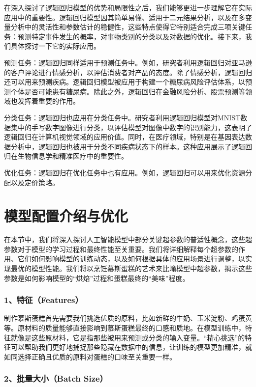 \begin{itemize}
在深入探讨了逻辑回归模型的优势和局限性之后，我们能够更进一步理解它在实际应用中的重要性。逻辑回归模型因其简单易懂、适用于二元结果分析，以及在多变量分析中的灵活性和参数估计的稳健性，这些特点使得它特别适合完成三项关键任务：预测特定事件发生的概率，对事物类别的分类以及对数据的优化。接下来，我们具体探讨一下它的实际应用。
            
预测任务：逻辑回归同样适用于预测任务中。例如，研究者利用逻辑回归对亚马逊的客户评论进行情感分析，以评估消费者对产品的态度。除了情感分析，逻辑回归还可以用来预测疾病。逻辑回归模型被应用于构建一个糖尿病风险评估体系，以预测个体是否可能患有糖尿病。除此之外，逻辑回归在金融风险分析、股票预测等领域也发挥着重要的作用。
            
分类任务：逻辑回归也应用在分类任务中。研究者利用逻辑回归模型对MNIST数据集中的手写数字图像进行分类，以评估模型对图像中数字的识别能力，这表明了逻辑回归在计算机视觉领域的应用价值。同时，在医疗领域，特别是在基因表达数据分析中，逻辑回归也被用于分类不同疾病状态下的样本。这种应用展示了逻辑回归在生物信息学和精准医疗中的重要性。
            
优化任务：逻辑回归在优化任务中也有应用。例如，逻辑回归可以用来优化资源分配以及定价策略。
\end{itemize}

\section{模型配置介绍与优化} 

在本节中，我们将深入探讨人工智能模型中部分关键超参数的普适性概念，这些超参数对于模型的学习过程和最终性能至关重要。我们将详细解释每个超参数的作用、它们如何影响模型的训练动态，以及如何根据具体的应用场景进行调整，以实现最优的模型性能。我们将以烹饪慕斯蛋糕的艺术来比喻模型中超参数，揭示这些参数是如何影响模型的“烘焙”过程和蛋糕最终的“美味”程度。

\subsubsection{1、特征（Features）}

制作慕斯蛋糕首先需要我们挑选优质的原料，比如新鲜的牛奶、玉米淀粉、鸡蛋黄等。原材料的质量能够直接影响到慕斯蛋糕最终的口感和质地。在模型训练中，特征就像是这些原材料，它是指那些被用来预测或分类的输入变量。“精心挑选”的特征可以帮助我们更好地捕捉那些隐藏在数据中的信息，让训练的模型更加精准，就如同选择正确且优质的原料对蛋糕的口味至关重要一样。

\subsubsection{2、批量大小（Batch Size）}

